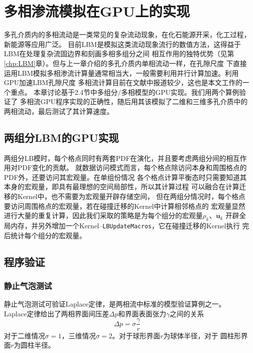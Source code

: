 \chapter{多相渗流模拟在GPU上的实现}
多孔介质内的多相流动是一类常见的复杂流动现象，在化石能源开采，化工过程，新能源等应用广泛。
目前LBM是模拟这类流动现象流行的数值方法，这得益于LBM在处理复杂流固边界和刻画多相多组分之间
相互作用的独特优势（见第\ref{chp:LBM}章）。但与上一章介绍的多孔介质内单相流动一样，在孔隙尺度
下直接运用LBM模拟多相渗流计算量通常相当大，一般需要利用并行计算加速。利用GPU加速LBM孔隙尺度
多相流计算目前在文献中报道较少，这也是本文工作的一个重点。
本章讨论基于2.4节中多组分/多相模型的GPU实现。我们用两个算例验证了
多相流GPU程序实现的正确性，随后用其该模拟了二维和三维多孔介质中的两相流动，最后测试了其计算速度。

\section{两组分LBM的GPU实现}
两组分LB模时，每个格点同时有两套PDF在演化，并且要考虑两组分间的相互作用对PDF变化的贡献。
就数据访问模式而言，每个格点除访问本身和周围格点的PDF外，还要访问其宏观量。在单组份情况
各个格点计算平衡态时只需要知道其本身的宏观量，即具有最理想的空间局部性，所以其计算过程
可以融合在计算迁移的Kernel中，也不需要为宏观量开辟存储空间，
但在两组分情况时，每个格点要访问周围格点的宏观量，若在碰撞迁移的Kernel中计算相邻格点的
宏观量显然进行大量的重复计算，因此我们采取的策略是为每个组分的宏观量$\rho_k$、$\bm u_k$
开辟全局内存，并另外增加一个Kernel\---\texttt{LBUpdateMacros}，它在碰撞迁移的Kernel执行
完后统计每个组分的宏观量。

\section{程序验证}
\subsection{静止气泡测试} \label{subsec:bubble}
静止气泡测试可验证Laplace定律，是两相流中标准的模型验证算例之一。
Laplace定律给出了两相界面间压差$\Delta p$和界面表面张力$\gamma$之间的关系
\begin{equation}
  \Delta p = \sigma\frac{\gamma}{r}
  \label{laplace}
\end{equation}
对于二维情况$\sigma=1$，三维情况$\sigma=2$。对于球形界面$r$为球体半径，对于
圆柱形界面$r$为圆柱半径。

